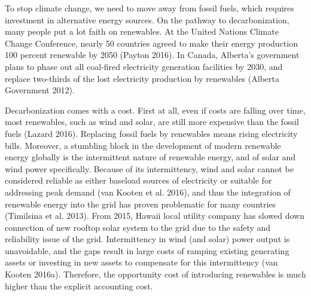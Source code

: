To stop climate change, we need to move away from fossil fuels, which
requires investment in alternative energy sources. On the pathway to
decarbonization, many people put a lot faith on renewables. At the
United Nations Climate Change Conference, nearly 50 countries agreed to
make their energy production 100 percent renewable by 2050 (Payton
2016). In Canada, Alberta's government plans to phase out all coal-fired
electricity generation facilities by 2030, and replace two-thirds of the
lost electricity production by renewables (Alberta Government 2012).

Decarbonization comes with a cost. First at all, even if costs are
falling over time, most renewables, such as wind and solar, are still
more expensive than the fossil fuels (Lazard 2016). Replacing fossil
fuels by renewables means rising electricity bills. Moreover, a
stumbling block in the development of modern renewable energy globally
is the intermittent nature of renewable energy, and of solar and wind
power specifically. Because of its intermittency, wind and solar cannot
be considered reliable as either baseload sources of electricity or
suitable for addressing peak demand (van Kooten et al. 2016), and thus
the integration of renewable energy into the grid has proven problematic
for many countries (Timilsina et al. 2013). From 2015, Hawaii local
utility company has slowed down connection of new rooftop solar system
to the grid due to the safety and reliability issue of the grid.
Intermittency in wind (and solar) power output is unavoidable, and the
gaps result in large costs of ramping existing generating assets or
investing in new assets to compensate for this intermittency (van Kooten
2016a). Therefore, the opportunity cost of introducing renewables is
much higher than the explicit accounting cost.

